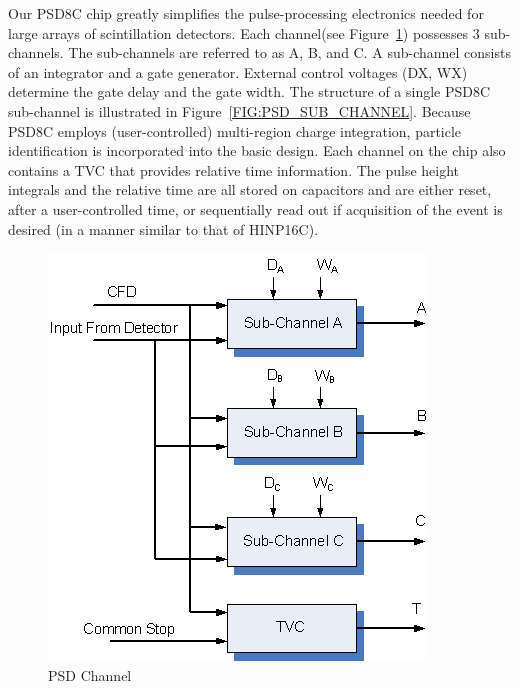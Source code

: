 \documentclass[12pt,oneside,final]{siuethesis}
\theoremstyle{definition}
\begin{document}
Our PSD8C chip greatly simplifies the pulse-processing electronics needed for large arrays of scintillation detectors. Each channel(see Figure~\ref{FIG:PSD_CHANNEL}) possesses 3 sub-channels. The sub-channels are referred to as A, B, and C. A sub-channel consists of an integrator and a gate generator. External control voltages (DX, WX) determine the gate delay and the gate width. The structure of a single PSD8C sub-channel is illustrated in Figure~\ref{FIG:PSD_SUB_CHANNEL}. Because PSD8C employs (user-controlled) multi-region charge integration, particle identification is incorporated into the basic design. Each channel on the chip also contains a TVC that provides relative time information. The pulse height integrals and the relative time are all stored on capacitors and are either reset, after a user-controlled time, or sequentially read out if acquisition of the event is desired (in a manner similar to that of HINP16C). 

\begin{figure}[htbp!]
	\centering
 	\includegraphics[scale=1.0,keepaspectratio=true]{./ch1_figures/PSD_channel.png}
 	\caption{PSD Channel}
 	\label{FIG:PSD_CHANNEL}
\end{figure}
\end{document}
